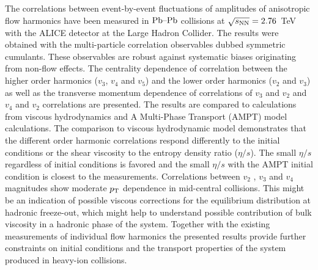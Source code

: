 The correlations between event-by-event fluctuations of amplitudes of anisotropic flow harmonics 
have been measured in $\textnormal{Pb--Pb}$ collisions at $\sqrt{s_{\textnormal{NN}}}=2.76$~TeV with the ALICE detector at the Large Hadron Collider. 
The results were obtained with the multi-particle correlation observables dubbed symmetric cumulants.
These observables are robust against systematic biases originating from non-flow effects. 
The centrality dependence of correlation between the higher order harmonics ($v_3$, $v_4$ and $v_5$) and the lower order harmonics ($v_2$ and $v_3$) as well as the transverse momentum dependence of correlations of $v_3$ and $v_2$ and $v_4$ and $v_2$ correlations are presented. 
The results are compared to calculations from viscous hydrodynamics and  A Multi-Phase Transport ({AMPT}) model calculations.
The comparison to viscous hydrodynamic model demonstrates that
the different order harmonic correlations respond differently to the initial conditions or the shear viscosity to the entropy density ratio ($\eta/s$). The small $\eta/s$ regardless of initial conditions is favored and the small $\eta/s$ with the AMPT initial condition is closest to the measurements. 
Correlations between $v_2$ , $v_3$ and $v_4$ magnitudes show moderate $p_{\rm T}$ dependence in mid-central collisions. This might be an indication of possible viscous corrections for the equilibrium distribution at hadronic freeze-out, which might help to understand possible contribution of bulk viscosity in a hadronic phase of the system.
Together with the existing measurements of individual flow harmonics the presented results provide further constraints 
on initial conditions and the transport properties of the system produced in heavy-ion collisions.
